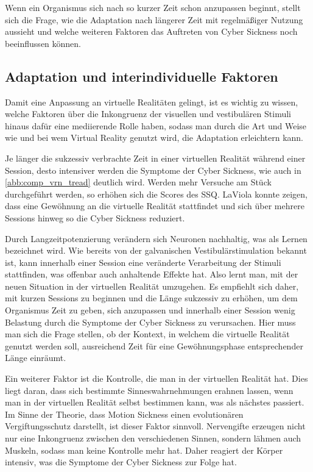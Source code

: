 Wenn ein Organismus sich nach so kurzer Zeit schon anzupassen beginnt, stellt sich die Frage, wie die Adaptation nach l\"angerer Zeit mit regelm\"a{\ss}iger Nutzung aussieht und welche weiteren Faktoren das Auftreten von Cyber Sickness noch beeinflussen k\"onnen.

\subsection{Adaptation und interindividuelle Faktoren}\label{Adaptation}

Damit eine Anpassung an virtuelle Realit\"aten gelingt, ist es wichtig zu wissen, welche Faktoren \"uber die Inkongruenz der visuellen und vestibul\"aren Stimuli hinaus daf\"ur eine mediierende Rolle haben, sodass man durch die Art und Weise wie und bei wem Virtual Reality genutzt wird, die Adaptation erleichtern kann.

Je l\"anger die sukzessiv verbrachte Zeit in einer virtuellen Realit\"at w\"ahrend einer Session, desto intensiver werden die Symptome der Cyber Sickness\cite{Aldaba:2017:VRNTreadGraphic}, wie auch in \autoref{abb:comp_vrn_tread} deutlich wird. Werden mehr Versuche am St\"uck durchgef\"uhrt werden, so erh\"ohen sich die Scores des SSQ. LaViola\cite{LaViola:2000:CSinVR} konnte zeigen, dass eine Gew\"ohnung an die virtuelle Realität stattfindet und sich \"uber mehrere Sessions hinweg so die Cyber Sickness reduziert.

Durch Langzeitpotenzierung ver\"andern sich Neuronen nachhaltig, was als Lernen bezeichnet wird. 
Wie bereits von der galvanischen Vestibul\"arstimulation bekannt ist, kann innerhalb einer Session eine ver\"anderte Verarbeitung der Stimuli stattfinden, was offenbar auch anhaltende Effekte hat. Also lernt man, mit der neuen Situation in der virtuellen Realit\"at umzugehen.
Es empfiehlt sich daher, mit kurzen Sessions zu beginnen und die L\"ange sukzessiv zu erh\"ohen, um dem Organismus Zeit zu geben, sich anzupassen und innerhalb einer Session wenig Belastung durch die Symptome der Cyber Sickness zu verursachen.
Hier muss man sich die Frage stellen, ob der Kontext, in welchem die virtuelle Realit\"at genutzt werden soll, ausreichend Zeit f\"ur eine Gew\"ohnungsphase entsprechender L\"ange einr\"aumt.

Ein weiterer Faktor ist die Kontrolle, die man in der virtuellen Realit\"at hat\cite{Kolasinski:1995:control}. Dies liegt daran, dass sich bestimmte Sinneswahrnehmungen erahnen lassen, wenn man in der virtuellen Realit\"at selbst bestimmen kann, was als n\"achstes passiert. Im Sinne der Theorie, dass Motion Sickness einen evolution\"aren Vergiftungsschutz darstellt, ist dieser Faktor sinnvoll. Nervengifte erzeugen nicht nur eine Inkongruenz zwischen den verschiedenen Sinnen, sondern l\"ahmen auch Muskeln, sodass man keine Kontrolle mehr hat. Daher reagiert der K\"orper intensiv, was die Symptome der Cyber Sickness zur Folge hat.

